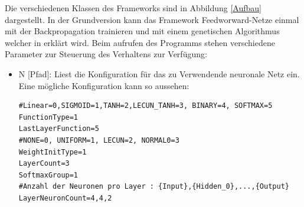 \documentclass[12pt]{article}
\begin{document}
Die verschiedenen Klassen des Frameworks sind in Abbildung \ref{Aufbau} dargestellt. In der Grundversion kann das Framework Feedworward-Netze einmal mit der Backpropagation trainieren und mit einem genetischen Algorithmus welcher in \cite{Helm} erklärt wird. Beim aufrufen des Programms stehen verschiedene Parameter zur Steuerung des Verhaltens zur Verfügung:
\begin{itemize}
\renewcommand\labelitemi{--}
\item N [Pfad]: Liest die Konfiguration für das zu Verwendende neuronale Netz ein. Eine mögliche Konfiguration kann so aussehen:
\begin{lstlisting}[caption={Beispielkonfigurationsdatei für ein neuronales Netz},captionpos=b, label=NNKonf]
#Linear=0,SIGMOID=1,TANH=2,LECUN_TANH=3, BINARY=4, SOFTMAX=5
FunctionType=1
LastLayerFunction=5
#NONE=0, UNIFORM=1, LECUN=2, NORMAL0=3
WeightInitType=1
LayerCount=3
SoftmaxGroup=1
#Anzahl der Neuronen pro Layer : {Input},{Hidden_0},...,{Output}
LayerNeuronCount=4,4,2


\end{lstlisting}
\end{itemize}
\end{document}

